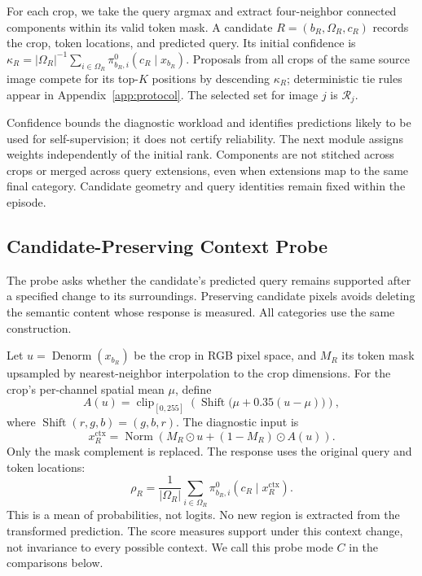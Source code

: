 \documentclass[letterpaper]{article}
\begin{document}
For each crop, we take the query argmax and extract four-neighbor connected components within its valid token mask. A candidate $R=(b_R,\Omega_R,c_R)$ records the crop, token locations, and predicted query. Its initial confidence is $\kappa_R=|\Omega_R|^{-1}\sum_{i\in\Omega_R}\pi^0_{b_R,i}(c_R\mid x_{b_R})$. Proposals from all crops of the same source image compete for its top-$K$ positions by descending $\kappa_R$; deterministic tie rules appear in Appendix~\ref{app:protocol}. The selected set for image $j$ is $\mathcal R_j$.

Confidence bounds the diagnostic workload and identifies predictions likely to be used for self-supervision; it does not certify reliability. The next module assigns weights independently of the initial rank. Components are not stitched across crops or merged across query extensions, even when extensions map to the same final category. Candidate geometry and query identities remain fixed within the episode.

\subsection{Candidate-Preserving Context Probe}
The probe asks whether the candidate's predicted query remains supported after a specified change to its surroundings. Preserving candidate pixels avoids deleting the semantic content whose response is measured. All categories use the same construction.

Let $u=\operatorname{Denorm}(x_{b_R})$ be the crop in RGB pixel space, and $M_R$ its token mask upsampled by nearest-neighbor interpolation to the crop dimensions. For the crop's per-channel spatial mean $\mu$, define
\begin{equation}
A(u)=\operatorname{clip}_{[0,255]}
\left(\operatorname{Shift}\bigl(\mu+0.35(u-\mu)\bigr)\right),
\end{equation}
where $\operatorname{Shift}(r,g,b)=(g,b,r)$. The diagnostic input is
\begin{equation}
x_R^{\mathrm{ctx}}=\operatorname{Norm}
\left(M_R\odot u+(1-M_R)\odot A(u)\right).
\label{eq:context-view}
\end{equation}
Only the mask complement is replaced. The response uses the original query and token locations:
\begin{equation}
\rho_R=\frac{1}{|\Omega_R|}\sum_{i\in\Omega_R}
\pi^0_{b_R,i}(c_R\mid x_R^{\mathrm{ctx}}).
\label{eq:support}
\end{equation}
This is a mean of probabilities, not logits. No new region is extracted from the transformed prediction. The score measures support under this context change, not invariance to every possible context. We call this probe mode $C$ in the comparisons below.
\end{document}

